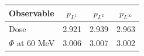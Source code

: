 \begin{tabular}{lccc}
\toprule
Observable & $p_{L^1}$ & $p_{L^2}$ & $p_{L^\infty}$ \\
\midrule
Dose & 2.921 & 2.939 & 2.963 \\
$\Phi$ at 60 MeV & 3.006 & 3.007 & 3.002 \\
\bottomrule
\end{tabular}
